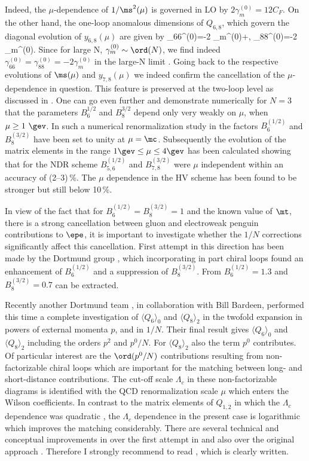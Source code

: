 Indeed, the $\mu$-dependence of $1/\ms^2(\mu)$ is governed in LO
by $2\gamma_m^{(0)}=12 C_F$. On the other hand, the one-loop
anomalous dimensions of $Q_{6,8}$, which govern the diagonal
evolution of $y_{6,8}(\mu)$ are given by
\be
\gamma_{66}^{(0)}=-2 \gamma_m^{(0)}+,
\quad\quad
\gamma_{88}^{(0)}=-2 \gamma_m^{(0)}.
\ee
Since for large N, $\gamma_m^{(0)}\sim\ord(N)$, we find indeed
$\gamma_{66}^{(0)}= \gamma_{88}^{(0)}=-2 \gamma_m^{(0)}$
in the large-N limit \cite{burasgerard:87}. 
Going back to the respective evolutions
of $\ms(\mu)$ and $y_{7,8}(\mu)$ we indeed confirm the cancellation
of the $\mu$-dependence in question. This feature is preserved
at the two-loop level as discussed in \cite{BJLW1}. 
One can go even further
and demonstrate numerically for $N=3$ that the parameters
$B^{1/2}_{6}$ and $B^{3/2}_{8}$ depend only very weakly on $\mu$,
when $\mu\ge 1~\gev$. In such a numerical
renormalization study in \cite{BJLW} the
factors $B_{6}^{(1/2)}$ and $B_{8}^{(3/2)}$  have been set to unity 
at $\mu=\mc$.
Subsequently the evolution of the matrix elements in the range $1\gev
\le \mu \le 4\gev$ has been calculated showing that for the NDR scheme
$B_{5,6}^{(1/2)}$ and $B_{7,8}^{(3/2)}$ were $\mu$ independent within
an accuracy of (2--3)\,\%. The $\mu$ dependence in the HV scheme has
been found to be stronger but still below 10\,\%.

In view of the fact that for $B^{(1/2)}_{6}=B^{(3/2)}_{8}=1$ and the
known value of $\mt$, there is a strong cancellation between
gluon and electroweak penguin contributions to $\epe$, it is
important to investigate whether the $1/N$ corrections significantly
affect this cancellation. First attempt in this direction has been
made by the Dortmund group \cite{heinrichetal:92, paschos:96}, 
which incorporating in part chiral
loops found an enhancement of $B_{6}^{(1/2)}$ and a suppression
of $B_{8}^{(3/2)}$. From \cite{paschos:96} $B^{(1/2)}_6=1.3$ and 
$B^{(3/2)}_8=0.7$ can be extracted.
 
Recently another Dortmund team \cite{DORT98}, in collaboration with Bill
Bardeen, performed this time a complete investigation
of $\langle Q_6\rangle_0$ and $\langle Q_8\rangle_2$ in the
twofold expansion in powers of external momenta $p$, and in 
$1/N$. Their final result gives $\langle Q_6\rangle_0$ and 
$\langle Q_8\rangle_2$ including the orders $p^2$ and $p^0/N$.
For $\langle Q_8\rangle_2$ also the term $p^0$ contributes.
Of particular interest are the $\ord(p^0/N)$ contributions
resulting from non-factorizable chiral loops which are
important for the matching between long- and short-distance
contributions. The cut-off scale $\Lambda_c$ in these
non-factorizable diagrams is identified with the QCD renormalization
scale $\mu$ which enters the Wilson coefficients. In contrast
to the matrix elements of $Q_{1,2}$ in which the $\Lambda_c$
dependence was quadratic \cite{bardeen:87}, 
the $\Lambda_c$ dependence in the present
case is logarithmic which improves the matching considerably.
There are several technical and conceptual improvements in \cite{DORT98}
over the first attempt in \cite{heinrichetal:92, paschos:96} 
and also over the original approach \cite{bardeen:87}.
Therefore I strongly recommend to read \cite{DORT98}, which is clearly
written.

